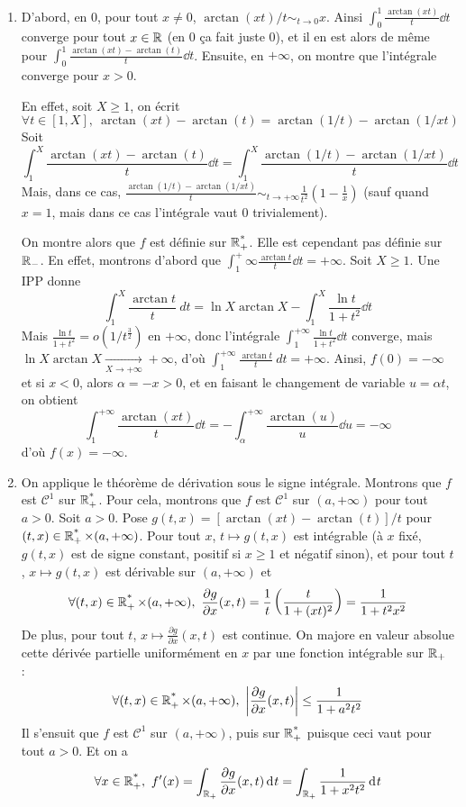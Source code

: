 \begin{solution}
	\begin{enumerate}
		\item D'abord, en $0$, pour tout $x\neq 0$, $\arctan(xt)/t\sim_{t\to 0} x$. 
		Ainsi $\int_0^1\frac{\arctan(xt)}t\dd t$ converge pour tout $x\in\operatorname{\mathbb R}$ (en $0$ ça fait juste $0$),
		et il en est alors de même pour $\int_0^1\frac{\arctan(xt)-\arctan(t)}t\dd t$.
		Ensuite, en $+\infty$, on montre que l'intégrale converge pour $x>0$. 
		
		En effet, soit $X\geq 1$, on écrit 
		\[
			\forall t\in[1,X],\ \arctan(xt)-\arctan(t)=\arctan(1/t)-\arctan(1/xt)	
		\]
		Soit 
		\[
			\int_1^X\frac{\arctan(xt)-\arctan(t)}t\dd t=\int_1^X\frac{\arctan(1/t)-\arctan(1/xt)}t \dd t
		\]
		Mais, dans ce cas, $\frac{\arctan(1/t)-\arctan(1/xt)}t\sim_{t\to +\infty}\frac1{t^2}\left(1-\frac1x\right)$ 
		(sauf quand $x=1$, mais dans ce cas l'intégrale vaut $0$ trivialement).

		On montre alors que $f$ est définie sur $\operatorname{\mathbb R_+^*}$. 
		Elle est cependant pas définie sur $\operatorname{\mathbb R}_-$.
		En effet, montrons d'abord que $\int_1^+{\infty}\frac{\arctan t}t\dd t=+\infty$.
		Soit $X\geq 1$. Une IPP donne 
		\[
			\int_1^X\frac{\arctan t}t\ dt =\ln X\arctan X-\int_1^X\frac{\ln t}{1+t^2}\dd t
		\]
		Mais $\frac{\ln t}{1+t^2}=o(1/t^{\frac32})$ en $+\infty$, donc l'intégrale $\int_1^{+\infty}\frac{\ln t}{1+t^2}\dd t$ converge, 
		mais $\ln X\arctan X\xrightarrow[X\to+\infty]{}+\infty$, d'où $\int_1^{+\infty}\frac{\arctan t}t\ dt=+\infty$. 
		Ainsi, $f(0)=-\infty$ et si $x<0$, alors $\alpha=-x>0$, et en faisant le changement de variable $u=\alpha t$, on obtient
		\[
			\int_1^{+\infty}\frac{\arctan(xt)}t\dd t=-\int_\alpha^{+\infty}\frac{\arctan(u)}u\dd u=-\infty
		\]
		d'où $f(x)=-\infty$.

		\item On applique le théorème de dérivation sous le signe intégrale.
		Montrons que $f$ est $\mathcal C^1$ sur $\operatorname{\mathbb R_+^*}$. Pour cela, montrons que $f$ est $\mathcal C^1$
		sur $(a,+\infty)$ pour tout $a>0$.
		Soit $a>0$. Pose $g(t,x)=[\arctan(xt)-\arctan(t)]/t$ pour $(t,x)\in\operatorname{\mathbb R_+^*}\times(a,+\infty)$. 
		Pour tout $x$, $t\mapsto g(t,x)$ est intégrable (à $x$ fixé, $g(t,x)$ est de signe constant, positif si $x\geq 1$ et négatif sinon),
		et pour tout $t$, $x\mapsto g(t,x)$ est dérivable sur $(a,+\infty)$ et 
		\[
			\forall (t,x)\in\Rpe\times(a,+\infty),\ \frac{\partial g}{\partial x}(x,t)=\frac1t\left(\frac{t}{1+(xt)^2}\right)=\frac1{1+t^2x^2}
		\]
		De plus, pour tout $t$, $x\mapsto \frac{\partial g}{\partial x}(x,t)$ est continue. On majore en valeur absolue cette dérivée partielle uniformément en $x$ par une fonction intégrable sur $\operatorname{\mathbb R}_+$ :
		\[
			\forall (t,x)\in\Rpe\times(a,+\infty),\ \left|\frac{\partial g}{\partial x}(x,t)\right|\leq \frac1{1+a^2t^2}
		\]
		Il s'ensuit que $f$ est $\mathcal C^1$ sur $(a,+\infty)$, puis sur $\operatorname{\mathbb R_+^*}$ puisque ceci vaut pour tout $a>0$.
		Et on a 
		\[
			\forall x\in\Rpe,\ f'(x)=\int_{\R_+}\frac{\partial g}{\partial x}(x,t)\dd t=\int_{\R_+}\frac1{1+x^2t^2}\dd t
		\]


\end{enumerate}
\end{solution}
